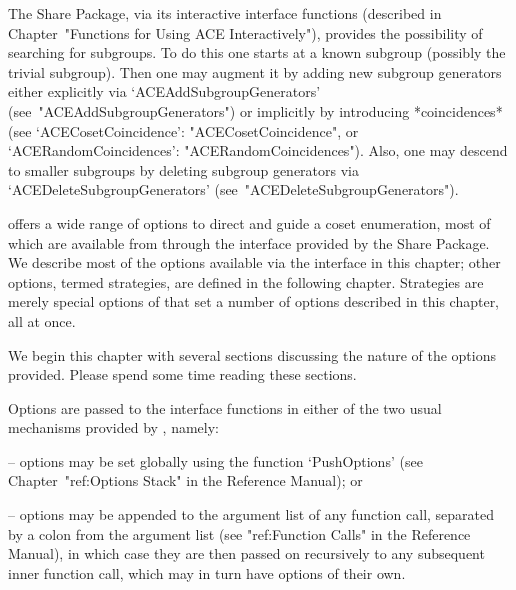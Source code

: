 
The  {\ACE}  Share  Package,  via  its  interactive  {\ACE}  interface
functions   (described   in   Chapter~"Functions   for    Using    ACE
Interactively"), provides the possibility of searching for  subgroups.
To do this one starts  at  a  known  subgroup  (possibly  the  trivial
subgroup). Then one may augment it by adding new  subgroup  generators
either        explicitly        via         `ACEAddSubgroupGenerators'
(see~"ACEAddSubgroupGenerators")   or   implicitly   by    introducing
*coincidences*     (see     `ACECosetCoincidence':
"ACECosetCoincidence",           or           `ACERandomCoincidences':
"ACERandomCoincidences"). Also, one may descend to  smaller  subgroups
by  deleting  subgroup  generators  via  `ACEDeleteSubgroupGenerators'
(see~"ACEDeleteSubgroupGenerators").


{\ACE} offers a wide range of options to  direct  and  guide  a  coset
enumeration, most of which  are  available  from  {\GAP}  through  the
interface provided by the {\ACE} Share Package. We  describe  most  of
the options  available  via  the  interface  in  this  chapter;  other
options, termed strategies, are  defined  in  the  following  chapter.
Strategies are merely special options of {\ACE} that set a  number  of
options described in this chapter, all at once.

We begin this chapter with several sections discussing the  nature  of
the options provided. Please spend some time reading these sections.


Options are passed to the {\ACE} interface functions in either of the
two usual mechanisms provided by {\GAP}, namely:

\beginlist

\item{--} options may be set globally using the function `PushOptions'
(see Chapter~"ref:Options Stack" in the {\GAP} Reference  Manual); or

\item{--} options may be appended to the argument list of any function
call, separated by a colon from the argument list  (see  "ref:Function
Calls" in the {\GAP} Reference Manual), in which case  they  are  then
passed on recursively to any subsequent inner function call, which may
in turn have options of their own.

